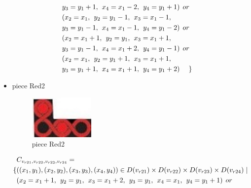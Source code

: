 \begin{appendices}
\begin{itemize}
\begin{align*}
\\&y_{3} = y_{1}+1,\hspace{1ex}x_{4} = x_{1}-2,\hspace{1ex}y_{4} = y_{1}+1)\hspace{1ex} or\\
&(x_{2} = x_{1},\hspace{1ex}y_{2} = y_{1}-1,\hspace{1ex}x_{3} = x_{1}-1, 
\\&y_{3} = y_{1}-1,\hspace{1ex}x_{4} = x_{1}-1,\hspace{1ex}y_{4} = y_{1}-2)\hspace{1ex} or\\
&(x_{2} = x_{1}+1,\hspace{1ex}y_{2} = y_{1},\hspace{1ex}x_{3} = x_{1}+1, 
\\&y_{3} = y_{1}-1,\hspace{1ex}x_{4} = x_{1}+2,\hspace{1ex}y_{4} = y_{1}-1)\hspace{1ex} or\\
&(x_{2} = x_{1},\hspace{1ex}y_{2} = y_{1}+1,\hspace{1ex}x_{3} = x_{1}+1, 
\\&y_{3} = y_{1}+1,\hspace{1ex}x_{4} = x_{1}+1,\hspace{1ex}y_{4} = y_{1}+2)\hspace{3ex} \} 
\end{align*}
\item piece Red2\\
\begin{figure}[H]
    \centering
    \includegraphics[width=0.3\textwidth]{figs/red2.jpg}
    \caption{piece Red2}
\end{figure}
\begin{align*}
&\Const{r21}{r22}{r23}{r24}=
\\\{&((x_{1},y_{1}),(x_{2},y_{2}),(x_{3},y_{3}),(x_{4},y_{4}))\in \Domain{r21}\times \Domain{r22}\times\Domain{r23}\times\Domain{r24}\mid\\
&(x_{2} = x_{1} + 1,\hspace{1ex}y_{2} = y_{1},\hspace{1ex}x_{3} = x_{1} + 2, \hspace{1ex}y_{3} = y_{1},\hspace{1ex}x_{4} = x_{1},\hspace{1ex}y_{4} = y_{1}+1)\hspace{1ex} or\\

\end{align*}
\end{itemize}
\end{appendices}
